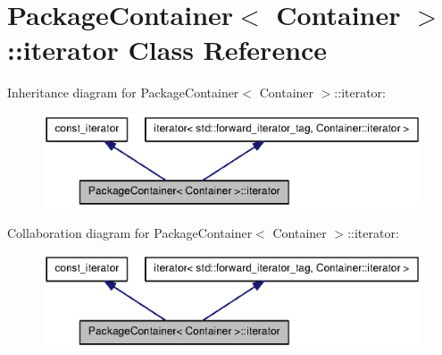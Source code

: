 \section{\-Package\-Container$<$ \-Container $>$\-:\-:iterator \-Class \-Reference}
\label{classAPT_1_1PackageContainer_1_1iterator}


\-Inheritance diagram for \-Package\-Container$<$ \-Container $>$\-:\-:iterator\-:
\nopagebreak
\begin{figure}[H]
\begin{center}
\leavevmode
\includegraphics[width=350pt]{classAPT_1_1PackageContainer_1_1iterator__inherit__graph}
\end{center}
\end{figure}


\-Collaboration diagram for \-Package\-Container$<$ \-Container $>$\-:\-:iterator\-:
\nopagebreak
\begin{figure}[H]
\begin{center}
\leavevmode
\includegraphics[width=350pt]{classAPT_1_1PackageContainer_1_1iterator__coll__graph}
\end{center}
\end{figure}
